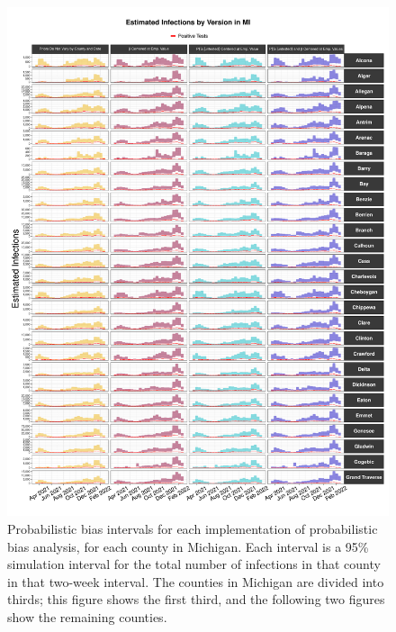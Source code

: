 \documentclass[12pt,twoside]{smiththesis}
\begin{document}
\begin{figure}

{\centering \includegraphics[width=1\linewidth]{figure/mi1_pb_compared_to_observed} 

}

\caption{\label{fig:pb_versions_mi-1} Probabilistic bias intervals for each implementation of probabilistic bias analysis, for each county in Michigan. Each interval is a 95\% simulation interval for the total number of infections in that county in that two-week interval. The counties in Michigan are divided into thirds; this figure shows the first third, and the following two figures show the remaining counties.}\label{fig:unnamed-chunk-114}
\end{figure}
\end{document}
